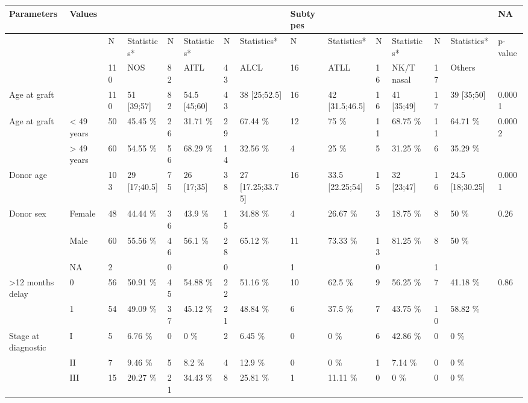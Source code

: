 \documentclass[a4paper,11pt] {article}
\begin{document}
\pagebreak[4]
\begin{landscape}




\begin{longtable}{lllllllllllllll}
  \hline
Parameters & Values &  &  &  &  &  &  & Subtypes &  &  &  &  &  & NA \\ 
  \hline
 &  & N & Statistics* & N & Statistics* & N & Statistics* & N & Statistics* & N & Statistics* & N & Statistics* & p-value \\ 
   &  & 110 & NOS & 82 & AITL & 43 & ALCL & 16 & ATLL & 16 & NK/T nasal & 17 & Others &  \\ 
  Age at graft &  & 110 & 51 [39;57] & 82 & 54.5 [45;60] & 43 & 38 [25;52.5] & 16 & 42 [31.5;46.5] & 16 & 41 [35;49] & 17 & 39 [35;50] & 0.0001 \\ 
  Age at graft & < 49 years & 50 & 45.45 \% & 26 & 31.71 \% & 29 & 67.44 \% & 12 & 75 \% & 11 & 68.75 \% & 11 & 64.71 \% & 0.0002 \\ 
   & > 49 years & 60 & 54.55 \% & 56 & 68.29 \% & 14 & 32.56 \% & 4 & 25 \% & 5 & 31.25 \% & 6 & 35.29 \% &  \\ 
  Donor age &  & 103 & 29 [17;40.5] & 75 & 26 [17;35] & 38 & 27 [17.25;33.75] & 16 & 33.5 [22.25;54] & 15 & 32 [23;47] & 16 & 24.5 [18;30.25] & 0.0001 \\ 
  Donor sex & Female & 48 & 44.44 \% & 36 & 43.9 \% & 15 & 34.88 \% & 4 & 26.67 \% & 3 & 18.75 \% & 8 & 50 \% & 0.26 \\ 
   & Male & 60 & 55.56 \% & 46 & 56.1 \% & 28 & 65.12 \% & 11 & 73.33 \% & 13 & 81.25 \% & 8 & 50 \% &  \\ 
   & NA & 2 &  & 0 &  & 0 &  & 1 &  & 0 &  & 1 &  &  \\ 
  >12 months delay & 0 & 56 & 50.91 \% & 45 & 54.88 \% & 22 & 51.16 \% & 10 & 62.5 \% & 9 & 56.25 \% & 7 & 41.18 \% & 0.86 \\ 
   & 1 & 54 & 49.09 \% & 37 & 45.12 \% & 21 & 48.84 \% & 6 & 37.5 \% & 7 & 43.75 \% & 10 & 58.82 \% &  \\ 
  Stage at diagnostic & I & 5 & 6.76 \% & 0 & 0 \% & 2 & 6.45 \% & 0 & 0 \% & 6 & 42.86 \% & 0 & 0 \% &  \\ 
   & II & 7 & 9.46 \% & 5 & 8.2 \% & 4 & 12.9 \% & 0 & 0 \% & 1 & 7.14 \% & 0 & 0 \% &  \\ 
   & III & 15 & 20.27 \% & 21 & 34.43 \% & 8 & 25.81 \% & 1 & 11.11 \% & 0 & 0 \% & 0 & 0 \% &  \\ 

\end{longtable}
\end{landscape}
\end{document}
